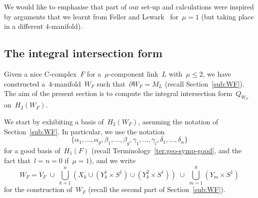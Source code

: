 \documentclass[10.9pt,a4paper]{amsart}
\theoremstyle{definition}
\theoremstyle{remark}
\begin{document}
We would like to emphasise
that part of our set-up and calculations were inspired by arguments that we learnt from Feller and Lewark~\cite{FL26} for~$\mu=1$ (but taking place in a different $4$-manifold).



\subsection{The integral intersection form}
\label{sec:ExplicitBasis}

Given a nice C-complex~$F$ for a~$\mu$-component link~$L$ with~$\mu\le 2$, we have constructed a~$4$-manifold~$W_F$ such that~$\partial W_F=M_L$ (recall Section~\ref{sub:WF}).
The aim of the present section is to compute the integral intersection form~$Q_{W_F}$ on~$H_2(W_F)$.

\medskip

We start by exhibiting a basis of~$H_2(W_F)$, assuming the notation of Section~\ref{sub:WF}.
In particular, we use the notation
\[
\{\alpha_1,\ldots,\alpha_{g}, \beta_1,\ldots,\beta_{g}, \gamma_1,\ldots,\gamma_l, \delta_1, \ldots, \delta_n\}
\]
for a good basis of~$H_1(F)$ (recall Terminology~\ref{ter:geo-symp-good}, and the fact that~$l=n=0$ if~$\mu=1$), and we write
\[
W_F = V_F \; \cup \; \bigcup_{k=1}^n \left(X_k\cup (Y_k^1\times S^1) \cup (Y_k^2 \times S^1) \right) \; \cup \;  \bigcup_{m = 1}^{g} \left(Y_m \times S^1 \right)
\]
for the construction of~$W_F$ (recall the second part of Section~\ref{sub:WF}).

\medskip
\end{document}
